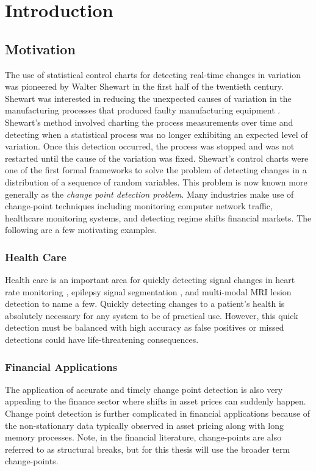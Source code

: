 \chapter{Introduction}
\section{Motivation}
The use of statistical control charts for detecting real-time changes in variation was pioneered by Walter Shewart in the first half of the twentieth century.  Shewart was interested in reducing the unexpected causes of variation in the manufacturing processes that produced faulty manufacturing equipment \cite{shewhart1931economic}. Shewart's method involved charting the process measurements over time and detecting when a statistical process was no longer exhibiting an expected level of variation. Once this detection occurred, the process was stopped and was not restarted until the cause of the variation was fixed.
Shewart's control charts were one of the first formal frameworks to solve the problem of detecting changes in a distribution of a sequence of random variables. This problem is now known more generally as the \textit{change point detection problem}. Many industries make use of change-point techniques including monitoring computer network traffic, healthcare monitoring systems, and detecting regime shifts financial markets. The following are a few motivating examples.

\subsection{Health Care}
Health care is an important area for quickly detecting signal changes in heart rate monitoring \cite{yang2006adaptive} \cite{staudacher2005new}, epilepsy signal segmentation \cite{malladi2013online}, and multi-modal MRI lesion detection \cite{bosc2003automatic} to name a few. Quickly detecting changes to a patient's health is absolutely necessary for any system to be of practical use. However, this quick detection must be balanced with high accuracy as false positives or missed detections could have life-threatening consequences.


\subsection{Financial Applications}
The application of accurate and timely change point detection is also very appealing to the finance sector where shifts in asset prices can suddenly happen. Change point detection is further complicated in financial applications because of the non-stationary data typically observed in asset pricing along with long memory processes. Note, in the financial literature, change-points  are also referred to as structural breaks, but for this thesis will use the broader term change-points.

